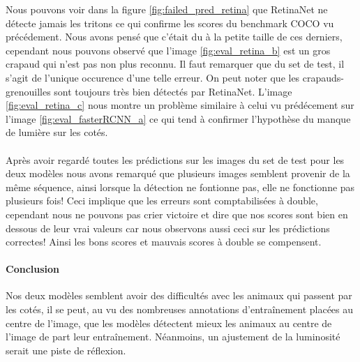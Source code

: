 Nous pouvons voir dans la figure \ref{fig:failed_pred_retina} que RetinaNet ne détecte jamais les tritons ce qui confirme les scores du benchmark COCO vu précédement. Nous avons pensé que c'était du à la petite taille de ces derniers, cependant nous pouvons observé que l'image \ref{fig:eval_retina_b} est un gros crapaud qui n'est pas non plus reconnu. Il faut remarquer que du set de test, il s'agit de l'unique occurence d'une telle erreur.
On peut noter que les crapauds-grenouilles sont toujours très bien détectés par RetinaNet. L'image \ref{fig:eval_retina_c} nous montre un problème similaire à celui vu prédécement sur l'image \ref{fig:eval_fasterRCNN_a} ce qui tend à confirmer l'hypothèse du manque de lumière sur les cotés.
\paragraph{}
 Après avoir regardé toutes les prédictions sur les images du set de test pour les deux modèles nous avons remarqué que plusieurs images semblent provenir de la même séquence, ainsi lorsque la détection ne fontionne pas, elle ne fonctionne pas plusieurs fois! Ceci implique que les erreurs sont comptabilisées à double, cependant nous ne pouvons pas crier victoire et dire que nos scores sont bien en dessous de leur vrai valeurs car nous observons aussi ceci sur les prédictions correctes! Ainsi les bons scores et mauvais scores à double se compensent.

 \paragraph{Conclusion} Nos deux modèles semblent avoir des difficultés avec les animaux qui passent par les cotés, il se peut, au vu des nombreuses annotations d'entraînement placées au centre de l'image, que les modèles détectent mieux les animaux au centre de l'image de part leur entraînement. Néanmoins, un ajustement de la luminosité serait une piste de réflexion.
